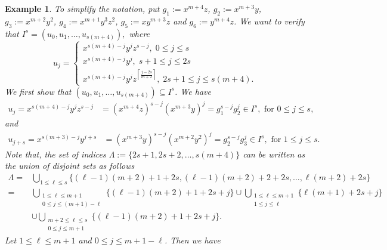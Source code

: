 \documentclass[11pt]{amsart}
\newtheorem{example}[theorem]{Example}
\begin{document}
\begin{example}
{To simplify the notation, 
 put  $g_1:=x^{m+4}z$, $g_2:=x^{m+3}y$, $g_3:=x^{m+2}y^2$,
$g_4:=x^{m+1}y^3z^2$, $g_5:=xy^{m+3}z$ and $g_6:=y^{m+4}z$.  We want to verify that 
$I^{s}=(u_0,u_1,\ldots,u_{s(m+4)}),$ where 
\begin{equation*}
u_j=\begin{cases} x^{s(m+4)-j}y^j z^{s-j},\;0\leq j\leq s \\
                  x^{s(m+4)-j}y^j, \;s+1 \leq j\leq 2s \\ 
									x^{s(m+4)-j}y^j z^{\left\lceil \frac{j-2s}{m+2}\right\rceil}, \;2s+1 \leq j\leq s(m+4). \end{cases}
\end{equation*}
We first show that $(u_0,u_1,\ldots,u_{s(m+4)}) \subseteq I^{s}$.  We have
\begin{align*}
 u_j = x^{s(m+4)-j}y^jz^{s-j} &= (x^{m+4}z)^{s-j}(x^{m+3}y)^j =g_1^{s-j}g_2^j \in I^{s},\text{ for }0\leq j\leq s, 
\end{align*} and
\begin{align*}
 u_{j+s} = x^{s(m+3)-j}y^{j+s}& = (x^{m+3}y)^{s-j}(x^{m+2}y^2)^j=g_2^{s-j}g_3^{j} \in 
I^{s},\text{ for }1\leq j\leq s.
\end{align*}
Note that, the set of indices $\Lambda:=\{2s+1,2s+2,\ldots, s(m+4)\}$ can be written as
the union of disjoint sets as follows
\begin{align*}
 \Lambda	= & \bigcup_{1\leq\ell\leq s}\{(\ell-1)(m+2)+1+2s,(\ell-1)(m+2)+2+2s,\ldots,\ell(m+2)+2s\}\\
				  = &\bigcup_{\substack{1\leq\ell\leq m+1 \\ 0\leq j\leq (m+1)-\ell}}\{(\ell-1)(m+2)+1+2s+j\} \cup
				     \bigcup_{\substack{1\leq\ell\leq m+1 \\ 1\leq j\leq \ell}}\{\ell(m+1)+2s+j\} \\
			      & \cup \bigcup_{\substack{m+2\leq\ell\leq s \\ 0\leq j\leq m+1}}\{(\ell-1)(m+2)+1+2s+j\}.
\end{align*}
Let $1\leq \ell\leq m+1$ and $0\leq j\leq m+1-\ell$. Then we have 

}
\end{example}
\end{document}

